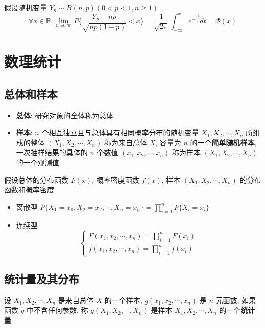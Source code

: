\begin{theorem}
	假设随机变量 $Y_{n}\sim B(n,p)(0 < p < 1, n\geq 1)$
	$$\forall x\in \mathbb{R}, \lim\limits_{n\Rightarrow \infty}P\{\dfrac{Y_{n}-np}{\sqrt{np(1-p)}}<x\}=\dfrac{1}{\sqrt{2\pi}}\int_{-\infty}^{x}e^{-\frac{t^2}{2}}dt = \varPhi(x)$$
\end{theorem}

\chapter{数理统计}
\section{总体和样本}
\begin{definition}[统计概念和统计量]
	\begin{itemize}
		\item \textbf{总体}: 研究对象的全体称为总体
		\item \textbf{样本}: $n$ 个相互独立且与总体具有相同概率分布的随机变量 $X_{1}, X_{2}, \cdots, X_{n}$ 所组成的整体 $(X_{1}, X_{2}, \cdots, X_{n})$ 
		称为来自总体 $X$, 容量为 $n$ 的一个\textbf{简单随机样本}, 一次抽样结果的具体的 $n$ 个数值 $(x_{1},x_{2},\cdots,x_{n})$ 称为样本 $(X_{1},X_{2},\cdots,X_{n})$ 的一个观测值
	\end{itemize}
\end{definition}

\begin{definition}[样本分布]
	假设总体的分布函数 $F(x)$, 概率密度函数 $f(x)$, 样本 $(X_{1},X_{2},\cdots,X_{n})$ 的分布函数和概率密度
	\begin{itemize}
		\item 离散型 $P\{X_{1} = x_{1}, X_{2} = x_{2}, \cdots, X_{n} = x_{n}\} = \prod\limits_{i = 1}^{n}P\{X_{i} = x_{i}\}$
		\item 连续型 
		$$\begin{cases}
			F(x_{1},x_{2},\cdots,x_{n}) = \prod\limits_{i = 1}^{n}F(x_{i})\\
			f(x_{1},x_{2},\cdots,x_{n}) = \prod\limits_{i = 1}^{n}f(x_{i})
		\end{cases}$$
	\end{itemize}
\end{definition}

\section{统计量及其分布}
\begin{definition}
	设 $X_{1},X_{2},\cdots,X_{n}$ 是来自总体 $X$ 的一个样本,
	$g(x_{1}, x_{2}, \cdots, x_{n})$ 是 $n$ 元函数, 如果函数 $g$ 中不含任何参数, 称 $g(X_{1},X_{2},\cdots,X_{n})$ 是样本 $X_{1},X_{2},\cdots,X_{n}$ 的一个\textbf{统计量}
\end{definition}

